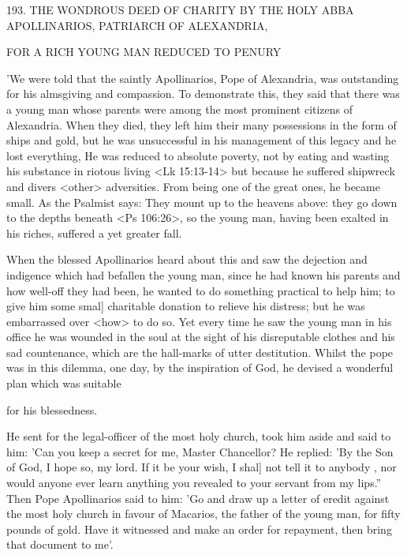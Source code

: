 193. THE WONDROUS DEED OF CHARITY BY THE
HOLY ABBA APOLLINARIOS,
PATRIARCH OF ALEXANDRIA,

FOR A RICH YOUNG MAN REDUCED TO PENURY

'We were told that the saintly Apollinarios, Pope of Alexandria, was
outstanding for his almsgiving and compassion. To demonstrate
this, they said that there was a young man whose parents were
among the most prominent citizens of Alexandria. When they died,
they left him their many possessions in the form of ships and gold,
but he was unsuccessful in his management of this legacy and he
lost everything, He was reduced to absolute poverty, not by eating
and wasting his substance in riotous living <Lk 15:13-14> but
because he suffered shipwreck and divers <other> adversities. From
being one of the great ones, he became small. As the Psalmist says:
They mount up to the heavens above: they go down to the depths
beneath <Ps 106:26>, so the young man, having been exalted in his
riches, suffered a yet greater fall.

When the blessed Apollinarios heard about this and saw the
dejection and indigence which had befallen the young man, since he
had known his parents and how well-off they had been, he wanted
to do something practical to help him; to give him some smal]
charitable donation to relieve his distress; but he was embarrassed
over <how> to do so. Yet every time he saw the young man in his
office he was wounded in the soul at the sight of his disreputable
clothes and his sad countenance, which are the hall-marks of utter
destitution. Whilst the pope was in this dilemma, one day, by the
inspiration of God, he devised a wonderful plan which was suitable

for his blessedness.

He sent for the legal-officer of the most holy church, took him
aside and said to him: 'Can you keep a secret for me, Master
Chancellor? He replied: 'By the Son of God, I hope so, my lord. If
it be your wish, I shal] not tell it to anybody , nor would anyone
ever learn anything you revealed to your servant from my lips.”
Then Pope Apollinarios said to him: 'Go and draw up a letter of
eredit against the most holy church in favour of Macarios, the
father of the young man, for fifty pounds of gold. Have it witnessed
and make an order for repayment, then bring that document to me'.

